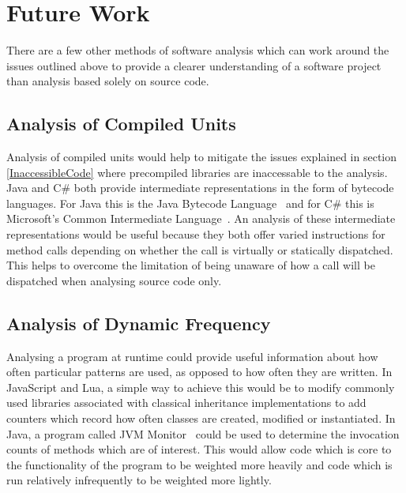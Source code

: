 \documentclass[11pt
              , a4paper
              , twoside
              , openright
              ]{report}
\begin{document}
\section{Future Work}
There are a few other methods of software analysis which can work around the issues outlined above to provide a clearer understanding of a software project than analysis based solely on source code.

\subsection{Analysis of Compiled Units}
Analysis of compiled units would help to mitigate the issues explained in section \ref{InaccessibleCode} where precompiled libraries are inaccessable to the analysis. Java and C\# both provide intermediate representations in the form of bytecode languages. For Java this is the Java Bytecode Language~\cite{JVMSpec} and for C\# this is Microsoft's Common Intermediate Language~\cite{CommonIntermediateLanguage}. An analysis of these intermediate representations would be useful because they both offer varied instructions for method calls depending on whether the call is virtually or statically dispatched. This helps to overcome the limitation of being unaware of how a call will be dispatched when analysing source code only.

\subsection{Analysis of Dynamic Frequency}
Analysing a program at runtime could provide useful information about how often particular patterns are used, as opposed to how often they are written. In JavaScript and Lua, a simple way to achieve this would be to modify commonly used libraries associated with classical inheritance implementations to add counters which record how often classes are created, modified or instantiated. In Java, a program called JVM Monitor~\cite{JVMMonitor} could be used to determine the invocation counts of methods which are of interest. This would allow code which is core to the functionality of the program to be weighted more heavily and code which is run relatively infrequently to be weighted more lightly.
\end{document}
